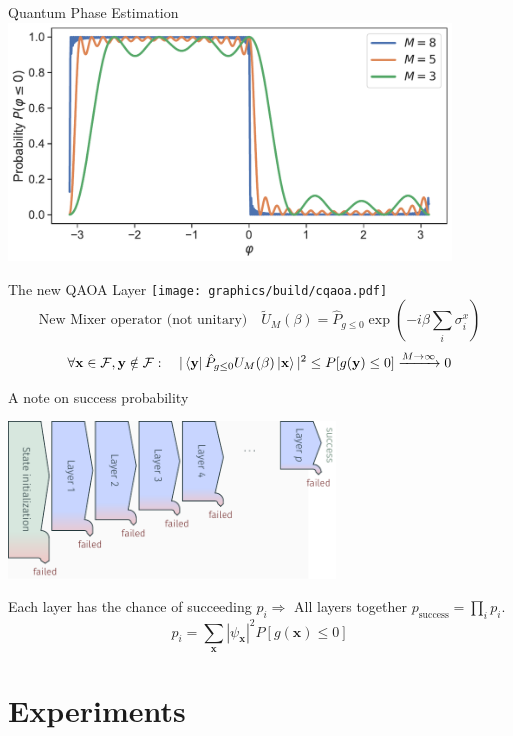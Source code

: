 \documentclass[aspectratio=169]{beamer}
\begin{document}
\begin{frame}{Quantum Phase Estimation}
    \centering
    \includegraphics[width=0.88\textwidth]{../plots/prob.pdf}
\end{frame}

\begin{frame}{The new QAOA Layer}
    \texttt{[image: graphics/build/cqaoa.pdf]}
    \[
        \text{New Mixer operator (not unitary)}\quad \tilde{U}_M(\beta) = \hat P_{g\leq0} \exp \left(-i\beta \sum_i \sigma^x_i\right) 
    \]
    \[
        \forall\mathbf{x} \in \mathcal{F}, \mathbf{y} \notin \mathcal{F}:\quad
        |\bra{\mathbf{y}}\hat P_{g \leq 0} U_M(\beta) \ket{\mathbf{x}}|^2 \leq
        P[g(\mathbf{y}) \leq 0] \xrightarrow{M\rightarrow
    \infty} 0
    \]
\end{frame}

\begin{frame}{A note on success probability}
    \begin{center}
        \includegraphics[width=0.65\textwidth]{graphics/build/probability.pdf}
    \end{center}
    Each layer has the chance of succeeding $p_i \Rightarrow$ All layers together
    $p_\text{success} = \prod_i p_i$.
    \[
        p_i = \sum_{\mathbf{x}} |\psi_\mathbf{x}|^2 P[g(\mathbf{x}) \leq 0]
    \]
\end{frame}


\section{Experiments}
\end{document}
